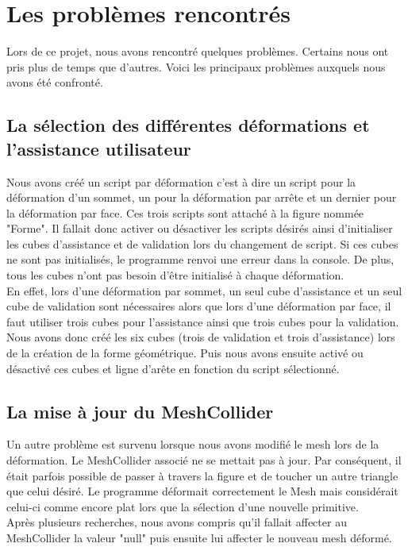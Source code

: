 \documentclass[a4paper,oneside,12pt,titlepage]{article}
\begin{document}
\section{Les problèmes rencontrés}

Lors de ce projet, nous avons rencontré quelques problèmes. Certains nous ont pris plus de temps que d'autres. Voici les principaux problèmes auxquels nous avons été confronté.

\subsection{La sélection des différentes déformations et l'assistance utilisateur}
Nous avons créé un script par déformation c'est à dire un script pour la déformation d'un sommet, un pour la déformation par arrête et un dernier pour la déformation par face. Ces trois scripts sont attaché à la figure nommée "Forme". Il fallait donc activer ou désactiver les scripts désirés ainsi d'initialiser les cubes d'assistance et de validation lors du changement de script. Si ces cubes ne sont pas initialisés, le programme renvoi une erreur dans la console. De plus, tous les cubes n'ont pas besoin d'être initialisé à chaque déformation.
\\ En effet, lors d'une déformation par sommet, un seul cube d'assistance et un seul cube de validation sont nécessaires alors que lors d'une déformation par face, il  faut utiliser  trois cubes pour l'assistance ainsi que trois cubes pour la validation. Nous avons donc créé les six cubes (trois de validation et trois d'assistance) lors de la création de la forme géométrique. Puis nous avons ensuite activé ou désactivé ces cubes et ligne d'arête en fonction du script sélectionné.

\subsection{La mise à jour du MeshCollider}

Un autre problème est survenu lorsque nous avons modifié le mesh lors de la déformation. Le MeshCollider associé ne se mettait pas à jour. Par conséquent, il était parfois possible de passer à travers la figure et de toucher un autre triangle que celui désiré. Le programme déformait correctement le Mesh mais considérait celui-ci comme encore plat lors que la sélection d'une nouvelle primitive.\\
Après plusieurs recherches, nous avons compris qu'il fallait affecter au MeshCollider la valeur "null" puis ensuite lui affecter le nouveau mesh déformé.\\
\end{document}
